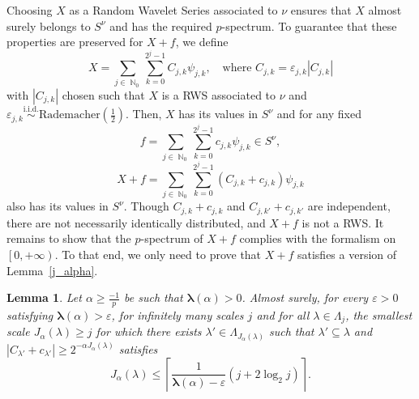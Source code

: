 \documentclass[a4paper,11pt,oneside]{article}
\DeclareMathOperator{\N}{\mathbb{N}}
\newcommand{\coint}[1]{\left[{#1}\right)}
\newcommand{\modu}[1]{\left\vert{#1}\right\vert}
\newcommand{\iid}{  \stackrel{\mathrm{i.i.d.}}{\sim} }
\theoremstyle{definition}
\theoremstyle{plain}
\newtheorem{lemma}[defi]{Lemma}
\begin{document}
Choosing $X$ as a Random Wavelet Series associated to $\nu$ ensures that $X$ almost surely belongs to $S^\nu$ and has the required $p$-spectrum. To guarantee that these properties are preserved for $X+f$, we define
\[
X=\sum_{j\in\N_0}\sum_{k=0}^{2^j-1}C_{j,k}\psi_{j,k},\quad\text{where }C_{j,k}=\varepsilon_{j,k}\modu{C_{j,k}}
\]
with $\modu{C_{j,k}}$ chosen such that $X$ is a RWS associated to $\nu$ and $\varepsilon_{j,k}\iid\text{Rademacher}\left(\frac{1}{2}\right)$. Then, $X$ has its values in $S^\nu$ and for any fixed
\[
f=\sum_{j\in\N_0}\sum_{k=0}^{2^j-1}c_{j,k}\psi_{j,k}\in S^\nu,
\]
\[
X+f=\sum_{j\in\N_0}\sum_{k=0}^{2^j-1}(C_{j,k}+c_{j,k})\psi_{j,k}
\]
also has its values in $S^\nu$. Though $C_{j,k}+c_{j,k}$ and $C_{j,k'}+c_{j,k'}$ are independent, there are not necessarily identically distributed, and $X+f$ is not a RWS. It remains to show that the $p$-spectrum of $X+f$ complies with the formalism on $\coint{0,+\infty}$. To that end, we only need to prove that $X+f$ satisfies a version of Lemma~\ref{j_alpha}.

\begin{lemma}
Let $\alpha\geq\frac{-1}{p}$ be such that $\bm{\lambda}(\alpha)>0$. Almost surely, for every $\varepsilon>0$ satisfying $\bm{\lambda}(\alpha)>\varepsilon$, for infinitely many scales $j$ and for all $\lambda\in\Lambda_j$, the smallest scale $J_\alpha(\lambda)\geq j$ for which there exists $\lambda'\in\Lambda_{J_\alpha(\lambda)}$ such that $\lambda'\subseteq \lambda$ and $\modu{C_{\lambda'}+c_{\lambda'}}\geq 2^{-\alpha J_\alpha(\lambda)}$ satisfies
\[
J_\alpha(\lambda)\leq \left\lceil\frac{1}{\bm{\lambda}(\alpha)-\varepsilon}(j+2\log_2j)\right\rceil.
\]
\end{lemma}
\end{document}
